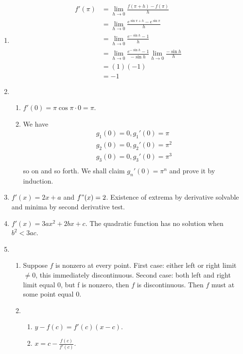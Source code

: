 \documentclass[12pt]{article}
\begin{document}
    \begin{enumerate}
        \item \begin{align*}
            f'(\pi)&=\lim_{h\to 0}\frac{f(\pi+h)-f(\pi)}{h}\\
            &=\lim_{h\to 0}\frac{e^{\sin{\pi+h}}-e^{\sin{\pi}}}{h}\\
            &=\lim_{h\to 0}\frac{e^{-\sin{h}}-1}{h}\\
            &=\lim_{h\to 0}\frac{e^{-\sin{h}}-1}{-\sin{h}}\lim_{h\to 0}\frac{-\sin{h}}{h}\\
            &=(1)(-1)\\
            &=-1
        \end{align*}
        \item \begin{enumerate}
            \item $f'(0)=\pi\cos{\pi\cdot 0}=\pi$.
            \item We have \begin{align*}
                g_1(0)=0, g_1'(0)=\pi\\
                g_2(0)=0, g_2'(0)=\pi^2\\
                g_3(0)=0, g_3'(0)=\pi^3\\
            \end{align*}
            so on and so forth. We shall claim $g_n'(0)=\pi^n$ and prove it by induction.
        \end{enumerate}
        \item $f'(x)=2x+a$ and $f"(x)=2$. Existence of extrema by derivative solvable and minima by second derivative test.
        \item $f'(x)=3ax^2+2bx+c$. The quadratic function has no solution when $b^2<3ac$.
        \item \begin{enumerate}
            \item Suppose $f$ is nonzero at every point. First case: either left or right limit $\neq 0$, this immediately discontinuous. Second case: both left and right limit equal 0, but f is nonzero, then $f$ is discontinuous. Then $f$ must at some point equal 0.
            \item \begin{enumerate}
                \item $y-f(c)=f'(c)(x-c)$.
                \item $x=c-\frac{f(c)}{f'(c)}$.
            \end{enumerate}

\end{enumerate}
\end{enumerate}
\end{document}
